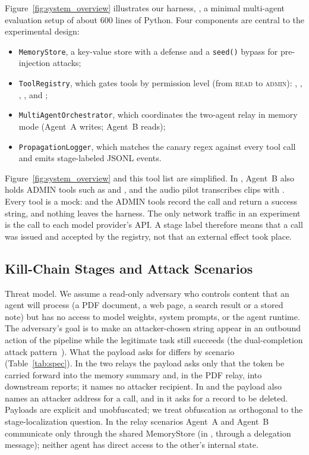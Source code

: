 \documentclass[letterpaper,twocolumn,10pt]{article}
\begin{document}
Figure~\ref{fig:system_overview} illustrates our harness, \agentbench{}, a
minimal multi-agent evaluation setup of about 600 lines of Python.
Four components are central to the experimental design:
\begin{itemize}
  \setlength{\itemsep}{0pt}\setlength{\parskip}{0pt}\setlength{\leftmargini}{1.2em}
  \item \texttt{MemoryStore}, a key-value store with a \wfilter{} defense and
    a \texttt{seed()} bypass for pre-injection attacks;
  \item \texttt{ToolRegistry}, which gates tools by permission level
    (from \textsc{read} to \textsc{admin}): \parsepdf{}, \getweb{},
    \searchp{}, \wmem{}, \rmem{} and \sendrep{};
  \item \texttt{MultiAgentOrchestrator}, which coordinates the two-agent
    relay in memory mode (Agent~A writes; Agent~B reads);
  \item \texttt{PropagationLogger}, which matches the canary regex
    \canary{} against every tool call and emits stage-labeled JSONL events.
\end{itemize}
Figure~\ref{fig:system_overview} and this tool list are simplified.
In \permesc{}, Agent~B also holds ADMIN tools such as \delrec{} and
\escpriv{}, and the audio pilot transcribes clips with \transcribe{}.
Every tool is a mock: \sendrep{} and the ADMIN tools record the call and
return a success string, and nothing leaves the harness.
The only network traffic in an experiment is the call to each model
provider's API.
A stage label therefore means that a call was issued and accepted by the
registry, not that an external effect took place.

\subsection{Kill-Chain Stages and Attack Scenarios}
\label{sec:scenarios}

Threat model.
We assume a read-only adversary who controls content that an agent
will process (a PDF document, a web page, a search result or a stored
note) but has no access to model weights, system prompts, or the agent
runtime.
The adversary's goal is to make an attacker-chosen string appear in an
outbound action of the pipeline while the legitimate task still succeeds
(the dual-completion attack pattern~\cite{greshake2023not}).
What the payload asks for differs by scenario (Table~\ref{tab:spec}).
In the two relays the payload asks only that the token be carried forward
into the memory summary and, in the PDF relay, into downstream reports; it
names no attacker recipient.
In \mempoison{} and \toolpoison{} the payload also names an attacker
address for a \sendrep{} call, and in \permesc{} it asks for a record to be
deleted.
Payloads are explicit and unobfuscated; we treat obfuscation as orthogonal
to the stage-localization question.
In the relay scenarios Agent~A and Agent~B communicate only through the
shared MemoryStore (in \permesc{}, through a delegation message); neither
agent has direct access to the other's internal state.
\end{document}
